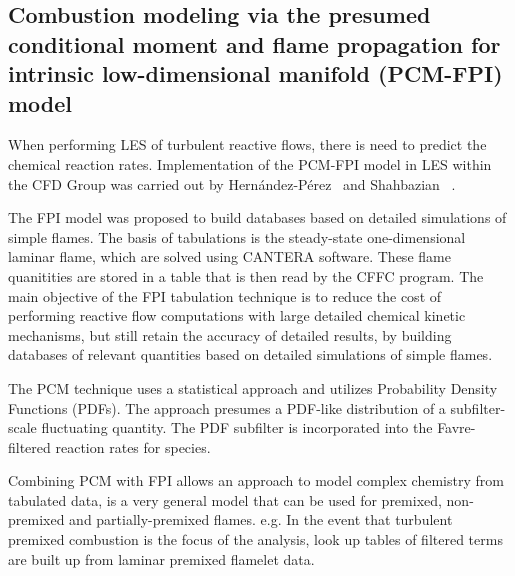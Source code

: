 \subsection{Combustion modeling via the presumed conditional moment and flame propagation for intrinsic low-dimensional manifold (PCM-FPI) model}

When performing LES of turbulent reactive flows, there is need to predict the chemical reaction rates. Implementation of the PCM-FPI model in LES within the CFD Group was carried out by Hern{\'a}ndez-P{\'e}rez~\cite{HPerez:2011} and Shahbazian \etal ~\cite{Shahbazian:2011}.\par

The FPI model was proposed to build databases based on detailed simulations of simple flames. The basis of tabulations is the steady-state one-dimensional laminar flame, which are solved using CANTERA software. These flame quanitities are stored in a table that is then read by the CFFC program. The main objective of the FPI tabulation technique is to reduce the cost of performing reactive
flow computations with large detailed chemical kinetic mechanisms, but still retain the accuracy of detailed results, by building databases of relevant quantities based on detailed simulations of simple flames.~\cite{HPerez:2011} \par

The PCM technique uses a statistical approach and utilizes Probability Density Functions (PDFs). The approach presumes a PDF-like distribution of a subfilter-scale fluctuating quantity. The PDF subfilter is incorporated into the Favre-filtered reaction rates for species.\par

Combining PCM with FPI allows an approach to model complex chemistry from tabulated data, is a very general model that can be used for premixed, non-premixed and partially-premixed flames. e.g. In the event that turbulent premixed combustion is the focus of the analysis, look up tables of filtered terms are built up from laminar premixed flamelet data.\par
